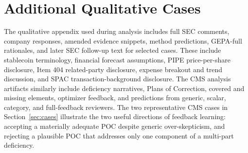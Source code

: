 \documentclass[11pt]{article}
\begin{document}
\section{Additional Qualitative Cases}
\label{app:cases}

The qualitative appendix used during analysis includes full SEC comments, company responses, amended evidence snippets, method predictions, GEPA-full rationales, and later SEC follow-up text for selected cases. These include stablecoin terminology, financial forecast assumptions, PIPE price-per-share disclosure, Item 404 related-party disclosure, expense breakout and trend discussion, and SPAC transaction-background disclosure. The CMS analysis artifacts similarly include deficiency narratives, Plans of Correction, covered and missing elements, optimizer feedback, and predictions from generic, scalar, category, and full-feedback reviewers. The two representative CMS cases in Section~\ref{sec:cases} illustrate the two useful directions of feedback learning: accepting a materially adequate POC despite generic over-skepticism, and rejecting a plausible POC that addresses only one component of a multi-part deficiency.
\end{document}

